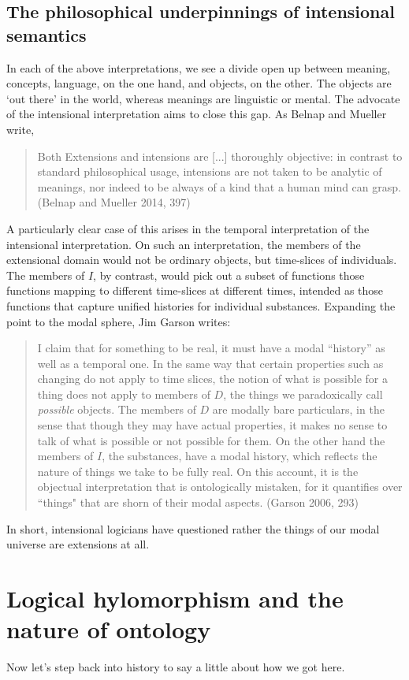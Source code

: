 \documentclass[]{article}
\begin{document}
\subsection{The philosophical underpinnings of intensional semantics}
In each of the above interpretations, we see a divide open up between meaning, concepts, language, on the one hand, and objects, on the other. The objects are `out there' in the world, whereas meanings are linguistic  or mental. The advocate of the intensional interpretation aims to close this gap. As Belnap and Mueller write, 
\begin{quote}
Both Extensions and intensions are [...] thoroughly objective: in contrast to standard philosophical usage, intensions are not taken to be analytic of meanings, nor indeed to be always of a kind that a human mind can grasp. (Belnap and Mueller 2014, 397)
\end{quote}
A particularly clear case of this arises in the temporal interpretation of the intensional interpretation. On such an interpretation, the members of the extensional domain would not be ordinary objects, but time-slices of individuals. The members of $I$, by contrast, would pick out a subset of functions those functions mapping to different time-slices at different times, intended as those functions that capture unified histories for individual substances. Expanding the point to the modal sphere, Jim Garson writes: 
\begin{quote}
I claim that for something to be real, it must have a modal ``history'' as well as a temporal one. In the same way that certain properties such as changing do not apply to time slices, the notion of what is possible for a thing does not apply to members of $D$, the things we paradoxically call \textit{possible} objects. The members of $D$ are modally bare particulars, in the sense that though they may have actual properties, it makes no sense to talk of what is possible or not possible for them. On the other hand the members of $I$, the substances, have a modal history, which reflects the nature of things we take to be fully real. On this account, it is the objectual interpretation that is ontologically mistaken, for it quantifies over ``things" that are shorn of their modal aspects. (Garson 2006, 293)
\end{quote}
In short, intensional logicians have questioned rather the things of our modal universe are extensions at all.
\section{Logical hylomorphism and the nature of ontology}
Now let's step back into history to say a little about how we got here. 
\end{document}
